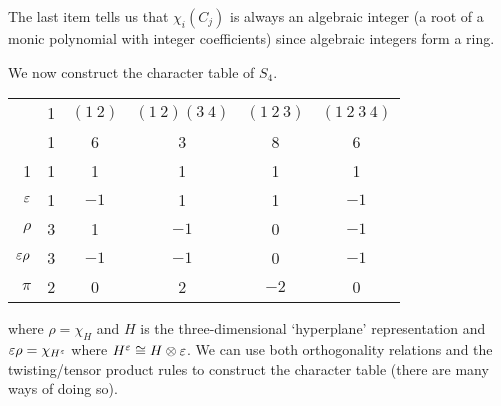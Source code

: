 \begin{rmk}
  The last item tells us that $\chi_i(C_j)$ is always an algebraic integer (a root of a monic polynomial with integer coefficients) since algebraic integers form a ring.
\end{rmk}

\begin{exam}
  We now construct the character table of $S_4$.
  \begin{center}
    \begin{tabular}[]{r | c c c c c}
      & 1 & $(1\ 2)$ & $(1\ 2)(3\ 4)$ & $(1\ 2\ 3)$ & $(1\ 2\ 3\ 4)$ \\
      & 1 & 6 & 3 & 8 & 6 \\ \hline
      1 & 1 & 1 & 1 & 1 & 1 \\
      $\varepsilon$ & 1 & $-1$ & 1 & 1 & $-1$ \\
      $\rho$ & 3 & 1 & $-1$ & 0 & $-1$ \\
      $\varepsilon\rho$ & 3 & $-1$ & $-1$ & 0 & $-1$ \\
      $\pi$ & 2 & 0 & 2 & $-2$ & 0
    \end{tabular}
  \end{center}
  where $\rho = \chi_H$ and $H$ is the three-dimensional `hyperplane' representation and $\varepsilon\rho = \chi_{H^\varepsilon}$ where $H^\varepsilon \cong H \otimes \varepsilon$.
  We can use both orthogonality relations and the twisting/tensor product rules to construct the character table (there are many ways of doing so).
\end{exam}

